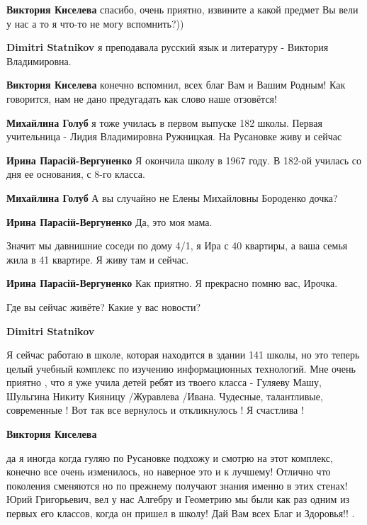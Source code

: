 \begin{itemize}
\begin{itemize}
\begin{itemize} %
\textbf{Виктория Киселева} спасибо, очень приятно, извините а какой предмет Вы вели у нас а то я что-то не могу вспомнить?))

\textbf{Dimitri Statnikov} я преподавала русский язык и литературу - Виктория Владимировна.

\textbf{Виктория Киселева} конечно вспомнил, всех благ Вам и Вашим Родным! Как говорится, нам не дано предугадать как слово наше отзовётся!
\end{itemize} %

\textbf{Михайлина Голуб} я тоже училась в первом выпуске 182 школы. Первая учительница - Лидия Владимировна Ружницкая. На Русановке живу и сейчас

\textbf{Ирина Парасій-Вергуненко} Я окончила школу в 1967 году. В 182-ой училась со дня ее основания, с 8-го класса.

\textbf{Михайлина Голуб} А вы случайно не Елены Михайловны Бороденко дочка?

\begin{itemize} %
\textbf{Ирина Парасій-Вергуненко} Да, это моя мама.

Значит мы давнишние соседи по дому 4/1, я Ира с 40 квартиры, а ваша семья жила в 41 квартире. Я живу там и сейчас.

\textbf{Ирина Парасій-Вергуненко} Как приятно. Я прекрасно помню вас, Ирочка.

Где вы сейчас живёте? Какие у вас новости?
\end{itemize} %

\textbf{Dimitri Statnikov} 

Я сейчас работаю в школе, которая находится в здании 141 школы, но это теперь
целый учебный комплекс по изучению информационных технологий. Мне очень приятно
, что я уже учила детей ребят из твоего класса - Гуляеву Машу, Шульгина Никиту
Кияницу /Журавлева /Ивана. Чудесные, талантливые, современные ! Вот так все
вернулось и откликнулось ! Я счастлива !


\textbf{Виктория Киселева} 

да я иногда когда гуляю по Русановке подхожу и смотрю на этот комплекс, конечно
все очень изменилось, но наверное это и к лучшему! Отлично что поколения
сменяются но по прежнему получают знания именно в этих стенах! Юрий
Григорьевич, вел у нас Алгебру и Геометрию мы были как раз одним из первых его
классов, когда он пришел в школу! Дай Вам всех Благ и Здоровья!!  .


\end{itemize}
\end{itemize}
